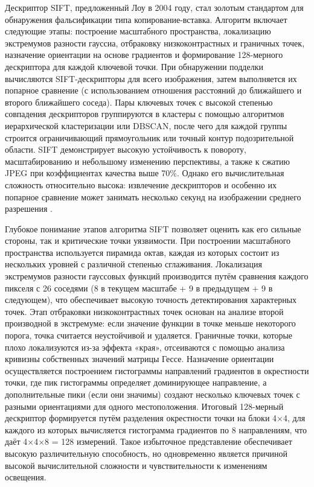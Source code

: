Дескриптор SIFT, предложенный Лоу в 2004 году, стал золотым стандартом для обнаружения фальсификации типа копирование-вставка\cite{13}. Алгоритм включает следующие этапы: построение масштабного пространства, локализацию экстремумов разности гауссиа, отбраковку низкоконтрастных и граничных точек, назначение ориентации на основе градиентов и формирование 128-мерного дескриптора для каждой ключевой точки. При обнаружении подделки вычисляются SIFT-дескрипторы для всего изображения, затем выполняется их попарное сравнение (с использованием отношения расстояний до ближайшего и второго ближайшего соседа). Пары ключевых точек с высокой степенью совпадения дескрипторов группируются в кластеры с помощью алгоритмов иерархической кластеризации или DBSCAN, после чего для каждой группы строится ограничивающий прямоугольник или точный контур подозрительной области\cite{16}. SIFT демонстрирует высокую устойчивость к повороту, масштабированию и небольшому изменению перспективы, а также к сжатию JPEG при коэффициентах качества выше 70\%. Однако его вычислительная сложность относительно высока: извлечение дескрипторов и особенно их попарное сравнение может занимать несколько секунд на изображении среднего разрешения \cite{17}.

Глубокое понимание этапов алгоритма SIFT позволяет оценить как его сильные стороны, так и критические точки уязвимости. При построении масштабного пространства используется пирамида октав, каждая из которых состоит из нескольких уровней с различной степенью сглаживания. Локализация экстремумов разности гауссовых функций производится путём сравнения каждого пикселя с 26 соседями (8 в текущем масштабе + 9 в предыдущем + 9 в следующем), что обеспечивает высокую точность детектирования характерных точек. Этап отбраковки низкоконтрастных точек основан на анализе второй производной в экстремуме: если значение функции в точке меньше некоторого порога, точка считается неустойчивой и удаляется. Граничные точки, которые плохо локализуются из-за эффекта «края», отсеиваются с помощью анализа кривизны собственных значений матрицы Гессе. Назначение ориентации осуществляется построением гистограммы направлений градиентов в окрестности точки, где пик гистограммы определяет доминирующее направление, а дополнительные пики (если они значимы) создают несколько ключевых точек с разными ориентациями для одного местоположения. Итоговый 128-мерный дескриптор формируется путём разделения окрестности точки на блоки 4×4, для каждого из которых вычисляется гистограмма градиентов по 8 направлениям, что даёт 4×4×8 = 128 измерений. Такое избыточное представление обеспечивает высокую различительную способность, но одновременно является причиной высокой вычислительной сложности и чувствительности к изменениям освещения.

